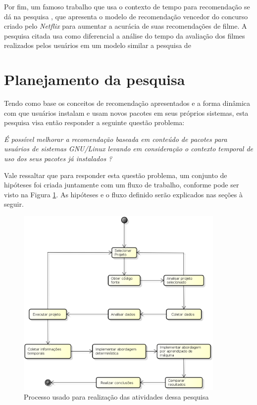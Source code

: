 Por fim, um famoso trabalho que usa o contexto de tempo para recomendação se dá na pesquisa \cite{koren2010collaborative}, que apresenta o modelo de recomendação
vencedor do concurso criado pelo \textit{Netflix} para aumentar a acurácia de suas recomendações de filme. A pesquisa citada usa como diferencial a análise do tempo da avaliação
dos filmes realizados pelos usuários em um modelo similar a pesquisa de \cite{basile2015modeling}


\section{Planejamento da pesquisa}

Tendo como base os conceitos de recomendação apresentados e a forma dinâmica com
que usuários instalam e usam novos pacotes em seus próprios sistemas, esta
pesquisa visa então responder a seguinte questão problema:

\begin{center}
\textit{É possível melhorar a recomendação baseada em conteúdo de pacotes para
usuários de sistemas GNU/Linux levando em consideração o contexto temporal de
uso dos seus pacotes já instalados ?}
\end{center}

Vale ressaltar que para responder esta questão problema, um conjunto de
hipóteses foi criada juntamente com um fluxo de trabalho, conforme pode ser visto na
Figura \ref{fig:planejamento_pesquisa}. As hipóteses e o fluxo definido serão
explicados nas seções à seguir.

\begin{figure}[h]
  \centering
  \includegraphics[width=0.9\textwidth]{figuras/planejamento_pesquisa.eps}
  \caption{Processo usado para realização das atividades dessa pesquisa}
  \label{fig:planejamento_pesquisa}
\end{figure}

